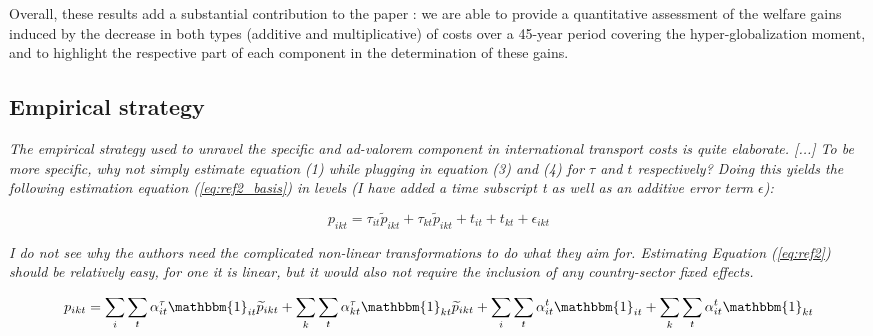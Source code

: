 \documentclass[a4paper,11pt]{article}
\begin{document}
Overall, these results add a substantial contribution to the paper : we are able to provide a quantitative assessment of the welfare gains induced by the decrease in both types (additive and multiplicative) of costs over a 45-year period covering the hyper-globalization moment, and to highlight the respective part of each component in the determination of these gains.






\subsection{Empirical strategy}

\textit{The empirical strategy used to unravel the specific and ad-valorem component in international
transport costs is quite elaborate. [...] To be more specific, why not simply estimate equation (1) while plugging
in equation (3) and (4) for $\tau$ and $t$ respectively? Doing this yields the following estimation equation (\ref{eq:ref2_basis}) in
levels (I have added a time subscript t as well as an additive error term $\epsilon$):}

\begin{equation}
p_{ikt}=\tau_{it}\widetilde{p}_{ikt}+ \tau_{kt}\widetilde{p}_{ikt} + t_{it} + t_{kt} + \epsilon_{ikt}   \label{eq:ref2_basis}
\end{equation}

\textit{I do not see why the authors need the complicated non-linear transformations to do what they aim
for. Estimating Equation (\ref{eq:ref2}) should be relatively easy, for one it is linear, but it would also not require the
inclusion of any country-sector fixed effects.}

\begin{equation}
p_{ikt}= \sum_i \sum_t \alpha_{it}^\tau \mathbbm{1}_{it}\widetilde{p}_{ikt} +  \sum_k \sum_t \alpha_{kt}^\tau \mathbbm{1}_{kt}\widetilde{p}_{ikt} + \sum_i \sum_t \alpha_{it}^t \mathbbm{1}_{it} + \sum_k \sum_t \alpha_{it}^t\mathbbm{1}_{kt} \label{eq:ref2}
\end{equation}
\end{document}
